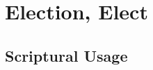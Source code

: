 \section{Election, Elect}
	\label{ELECTION}
	




	


\subsection{Scriptural Usage} %
	\label{ELECTION-SCRIPTURES}

